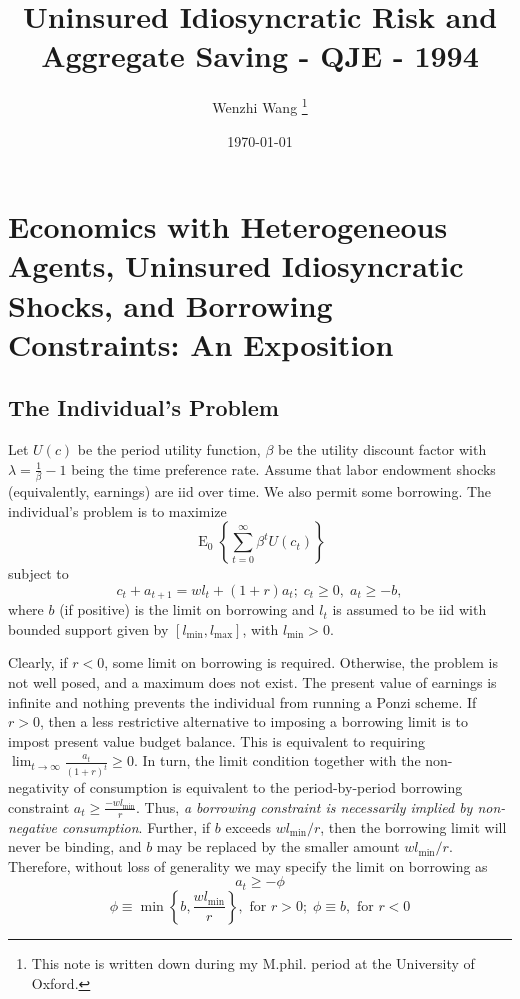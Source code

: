 \documentclass[12pt]{article}
\theoremstyle{definition}
\begin{document}
\title{\bf {Uninsured Idiosyncratic Risk and Aggregate Saving - QJE - 1994}}
\author{Wenzhi Wang \thanks{This note is written down during my M.phil. period at the University of Oxford. } }
\date{\today}

\maketitle

\section{Economics with Heterogeneous Agents, Uninsured Idiosyncratic Shocks, and Borrowing Constraints: An Exposition}


\subsection{The Individual's Problem}
Let $U(c)$ be the period utility function, $\beta$ be the utility discount factor with $\lambda = \frac{1}{\beta} -1$ being the time preference rate. Assume that labor endowment shocks (equivalently, earnings) are iid over time. We also permit some borrowing. The individual's problem is to maximize
\begin{equation}
	\label{1a} \tag{1a}
	\operatorname{E}_0 \left\{\sum_{t=0}^\infty \beta^t U(c_t) \right\}
\end{equation}
subject to
\begin{equation}
	\label{1b} \tag{1b}
	c_t + a_{t+1} = w l_t + (1+r) a_t; \; c_t \geq 0, \; a_t \geq -b, 
\end{equation}
where $b$ (if positive) is the limit on borrowing and $l_t$ is assumed to be iid with bounded support given by $\left[l_{\min}, l_{\max} \right]$, with $l_{\min} > 0$.

Clearly, if $r<0$, some limit on borrowing is required. Otherwise, the problem is not well posed, and a maximum does not exist. The present value of earnings is infinite and nothing prevents the individual from running a Ponzi scheme. If $r>0$, then a less restrictive alternative to imposing a borrowing limit is to impost present value budget balance. This is equivalent to requiring $\lim
_{t\rightarrow \infty} \frac{a_t}{(1+r)^t} \geq 0$. In turn, the limit condition together with the non-negativity of consumption is equivalent to the period-by-period borrowing constraint $a_t \geq \frac{-w l_{\min}}{r}$. Thus, \emph{a borrowing constraint is necessarily implied by non-negative consumption}. Further, if $b$ exceeds $w l_{\min} /r$, then the borrowing limit will never be binding, and $b$ may be replaced by the smaller amount $w l_{\min} /r$. Therefore, without loss of generality we may specify the limit on borrowing as 
\begin{equation}
	\label{2a} \tag{2a}
	a_t \geq -\phi
\end{equation}
\begin{equation}
	\label{2b} \tag{2b}
	\phi \equiv \min \left\{b, \frac{w l_{\min}}{r} \right\}, \text{ for } r>0;\; \phi \equiv b, \text{ for } r<0
\end{equation}
\end{document}
